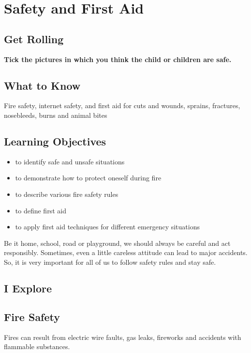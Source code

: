 \chapter{Safety and First Aid}
\section{Get Rolling}
\textbf{Tick the pictures in which you think the child or children are safe.}
\section{What to Know}
Fire safety, internet safety, and first aid for cuts and wounds, sprains, fractures, nosebleeds, burns and animal bites
\section{\textbf{Learning Objectives}}
\begin{itemize}
    \item to identify safe and unsafe situations
    \item to demonstrate how to protect oneself during fire
    \item to describe various fire safety rules
    \item to define first aid
    \item to apply first aid techniques for different emergency situations
\end{itemize}
Be it home, school, road or playground, we should always be careful and act responsibly. Sometimes, even a little careless attitude can lead to major accidents. So, it is very important for all of us to follow safety rules and stay safe.
\vspace{0.6in}
\section{I Explore}
\section{Fire Safety}
Fires can result from electric wire faults, gas leaks, fireworks and accidents with flammable substances.
